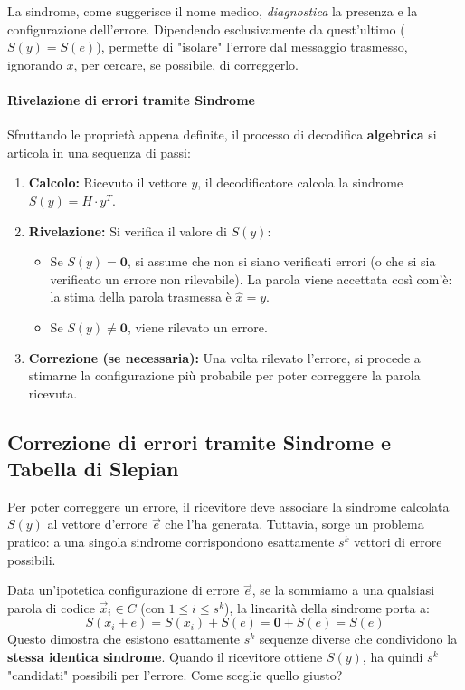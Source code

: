La sindrome, come suggerisce il nome medico, \textit{diagnostica} la presenza e la configurazione dell'errore. Dipendendo esclusivamente da quest'ultimo ($S(y) = S(e)$), permette di "isolare" l'errore dal messaggio trasmesso, ignorando $x$, per cercare, se possibile, di correggerlo.

\paragraph{Rivelazione di errori tramite Sindrome}
Sfruttando le proprietà appena definite, il processo di decodifica \textbf{algebrica} si articola in una sequenza di passi:
\begin{enumerate}
    \item \textbf{Calcolo:} Ricevuto il vettore $y$, il decodificatore calcola la sindrome $S(y) = H \cdot y^T$.
    \item \textbf{Rivelazione:} Si verifica il valore di $S(y)$:
    \begin{itemize}
        \item Se $S(y) = \mathbf{0}$, si assume che non si siano verificati errori (o che si sia verificato un errore non rilevabile). La parola viene accettata così com'è: la stima della parola trasmessa è $\hat{x} = y$.
        \item Se $S(y) \neq \mathbf{0}$, viene rilevato un errore.
    \end{itemize}
    \item \textbf{Correzione (se necessaria):} Una volta rilevato l'errore, si procede a stimarne la configurazione più probabile per poter correggere la parola ricevuta.
\end{enumerate}


\subsection{Correzione di errori tramite Sindrome e Tabella di Slepian}

Per poter correggere un errore, il ricevitore deve associare la sindrome calcolata $S(y)$ al vettore d'errore $\vec{e}$ che l'ha generata. Tuttavia, sorge un problema pratico: a una singola sindrome corrispondono esattamente $s^k$ vettori di errore possibili.

Data un'ipotetica configurazione di errore $\vec{e}$, se la sommiamo a una qualsiasi parola di codice $\vec{x}_i \in C$ (con $1 \leq i \leq s^k$), la linearità della sindrome porta a:
\[ S(x_i + e) = S(x_i) + S(e) = \mathbf{0} + S(e) = S(e) \]
Questo dimostra che esistono esattamente $s^k$ sequenze diverse che condividono la \textbf{stessa identica sindrome}. Quando il ricevitore ottiene $S(y)$, ha quindi $s^k$ "candidati" possibili per l'errore. Come sceglie quello giusto?

